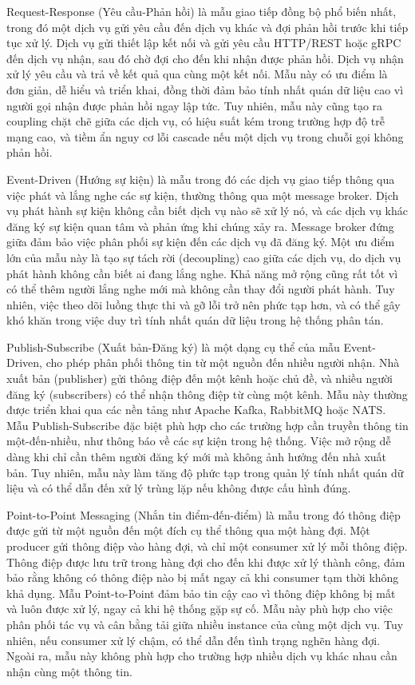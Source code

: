 Request-Response (Yêu cầu-Phản hồi) là mẫu giao tiếp đồng bộ phổ biến nhất, trong đó một dịch vụ gửi yêu cầu đến dịch vụ khác và đợi phản hồi trước khi tiếp tục xử lý. Dịch vụ gửi thiết lập kết nối và gửi yêu cầu HTTP/REST hoặc gRPC đến dịch vụ nhận, sau đó chờ đợi cho đến khi nhận được phản hồi. Dịch vụ nhận xử lý yêu cầu và trả về kết quả qua cùng một kết nối. Mẫu này có ưu điểm là đơn giản, dễ hiểu và triển khai, đồng thời đảm bảo tính nhất quán dữ liệu cao vì người gọi nhận được phản hồi ngay lập tức. Tuy nhiên, mẫu này cũng tạo ra coupling chặt chẽ giữa các dịch vụ, có hiệu suất kém trong trường hợp độ trễ mạng cao, và tiềm ẩn nguy cơ lỗi cascade nếu một dịch vụ trong chuỗi gọi không phản hồi.

Event-Driven (Hướng sự kiện) là mẫu trong đó các dịch vụ giao tiếp thông qua việc phát và lắng nghe các sự kiện, thường thông qua một message broker. Dịch vụ phát hành sự kiện không cần biết dịch vụ nào sẽ xử lý nó, và các dịch vụ khác đăng ký sự kiện quan tâm và phản ứng khi chúng xảy ra. Message broker đứng giữa đảm bảo việc phân phối sự kiện đến các dịch vụ đã đăng ký. Một ưu điểm lớn của mẫu này là tạo sự tách rời (decoupling) cao giữa các dịch vụ, do dịch vụ phát hành không cần biết ai đang lắng nghe. Khả năng mở rộng cũng rất tốt vì có thể thêm người lắng nghe mới mà không cần thay đổi người phát hành. Tuy nhiên, việc theo dõi luồng thực thi và gỡ lỗi trở nên phức tạp hơn, và có thể gây khó khăn trong việc duy trì tính nhất quán dữ liệu trong hệ thống phân tán.

Publish-Subscribe (Xuất bản-Đăng ký) là một dạng cụ thể của mẫu Event-Driven, cho phép phân phối thông tin từ một nguồn đến nhiều người nhận. Nhà xuất bản (publisher) gửi thông điệp đến một kênh hoặc chủ đề, và nhiều người đăng ký (subscribers) có thể nhận thông điệp từ cùng một kênh. Mẫu này thường được triển khai qua các nền tảng như Apache Kafka, RabbitMQ hoặc NATS. Mẫu Publish-Subscribe đặc biệt phù hợp cho các trường hợp cần truyền thông tin một-đến-nhiều, như thông báo về các sự kiện trong hệ thống. Việc mở rộng dễ dàng khi chỉ cần thêm người đăng ký mới mà không ảnh hưởng đến nhà xuất bản. Tuy nhiên, mẫu này làm tăng độ phức tạp trong quản lý tính nhất quán dữ liệu và có thể dẫn đến xử lý trùng lặp nếu không được cấu hình đúng.

Point-to-Point Messaging (Nhắn tin điểm-đến-điểm) là mẫu trong đó thông điệp được gửi từ một nguồn đến một đích cụ thể thông qua một hàng đợi. Một producer gửi thông điệp vào hàng đợi, và chỉ một consumer xử lý mỗi thông điệp. Thông điệp được lưu trữ trong hàng đợi cho đến khi được xử lý thành công, đảm bảo rằng không có thông điệp nào bị mất ngay cả khi consumer tạm thời không khả dụng. Mẫu Point-to-Point đảm bảo tin cậy cao vì thông điệp không bị mất và luôn được xử lý, ngay cả khi hệ thống gặp sự cố. Mẫu này phù hợp cho việc phân phối tác vụ và cân bằng tải giữa nhiều instance của cùng một dịch vụ. Tuy nhiên, nếu consumer xử lý chậm, có thể dẫn đến tình trạng nghẽn hàng đợi. Ngoài ra, mẫu này không phù hợp cho trường hợp nhiều dịch vụ khác nhau cần nhận cùng một thông tin.

